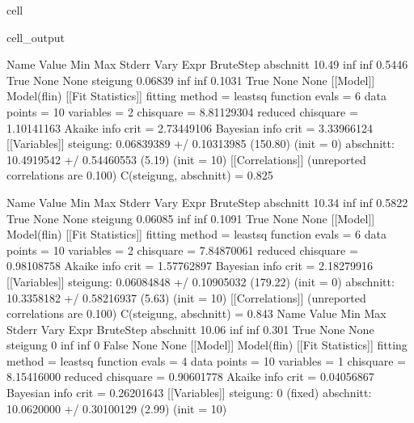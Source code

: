 \documentclass[letterpaper,10pt,english]{jupyterBook}
\begin{document}
\begin{sphinxuseclass}{cell}
\begin{sphinxVerbatimOutput}
\begin{sphinxuseclass}{cell_output}
\begin{sphinxVerbatim}[commandchars=\\\{\}]
Name          Value      Min      Max   Stderr     Vary     Expr Brute\PYGZus{}Step
abschnitt     10.49     \PYGZhy{}inf      inf   0.5446     True     None     None
steigung   \PYGZhy{}0.06839     \PYGZhy{}inf      inf   0.1031     True     None     None
[[Model]]
    Model(f\PYGZus{}lin)
[[Fit Statistics]]
    \PYGZsh{} fitting method   = leastsq
    \PYGZsh{} function evals   = 6
    \PYGZsh{} data points      = 10
    \PYGZsh{} variables        = 2
    chi\PYGZhy{}square         = 8.81129304
    reduced chi\PYGZhy{}square = 1.10141163
    Akaike info crit   = 2.73449106
    Bayesian info crit = 3.33966124
[[Variables]]
    steigung:  \PYGZhy{}0.06839389 +/\PYGZhy{} 0.10313985 (150.80\PYGZpc{}) (init = 0)
    abschnitt:  10.4919542 +/\PYGZhy{} 0.54460553 (5.19\PYGZpc{}) (init = 10)
[[Correlations]] (unreported correlations are \PYGZlt{} 0.100)
    C(steigung, abschnitt) = \PYGZhy{}0.825
\end{sphinxVerbatim}

\noindent{}

\begin{sphinxVerbatim}[commandchars=\\\{\}]
Name          Value      Min      Max   Stderr     Vary     Expr Brute\PYGZus{}Step
abschnitt     10.34     \PYGZhy{}inf      inf   0.5822     True     None     None
steigung   \PYGZhy{}0.06085     \PYGZhy{}inf      inf   0.1091     True     None     None
[[Model]]
    Model(f\PYGZus{}lin)
[[Fit Statistics]]
    \PYGZsh{} fitting method   = leastsq
    \PYGZsh{} function evals   = 6
    \PYGZsh{} data points      = 10
    \PYGZsh{} variables        = 2
    chi\PYGZhy{}square         = 7.84870061
    reduced chi\PYGZhy{}square = 0.98108758
    Akaike info crit   = 1.57762897
    Bayesian info crit = 2.18279916
[[Variables]]
    steigung:  \PYGZhy{}0.06084848 +/\PYGZhy{} 0.10905032 (179.22\PYGZpc{}) (init = 0)
    abschnitt:  10.3358182 +/\PYGZhy{} 0.58216937 (5.63\PYGZpc{}) (init = 10)
[[Correlations]] (unreported correlations are \PYGZlt{} 0.100)
    C(steigung, abschnitt) = \PYGZhy{}0.843
Name          Value      Min      Max   Stderr     Vary     Expr Brute\PYGZus{}Step
abschnitt     10.06     \PYGZhy{}inf      inf    0.301     True     None     None
steigung          0     \PYGZhy{}inf      inf        0    False     None     None
[[Model]]
    Model(f\PYGZus{}lin)
[[Fit Statistics]]
    \PYGZsh{} fitting method   = leastsq
    \PYGZsh{} function evals   = 4
    \PYGZsh{} data points      = 10
    \PYGZsh{} variables        = 1
    chi\PYGZhy{}square         = 8.15416000
    reduced chi\PYGZhy{}square = 0.90601778
    Akaike info crit   = \PYGZhy{}0.04056867
    Bayesian info crit = 0.26201643
[[Variables]]
    steigung:   0 (fixed)
    abschnitt:  10.0620000 +/\PYGZhy{} 0.30100129 (2.99\PYGZpc{}) (init = 10)
\end{sphinxVerbatim}


\end{sphinxuseclass}
\end{sphinxVerbatimOutput}
\end{sphinxuseclass}
\end{document}
